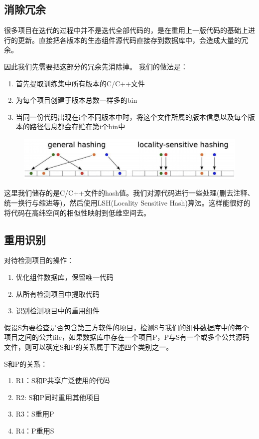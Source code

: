 \documentclass{cjc}
\begin{document}
\subsection{消除冗余}
很多项目在迭代的过程中并不是迭代全部代码的，是在重用上一版代码的基础上进行的更新。直接把各版本的生态组件源代码直接存到数据库中，会造成大量的冗余。

因此我们先需要把这部分的冗余先消除掉。
我们的做法是：
\begin{enumerate}
\item 首先提取训练集中所有版本的C/C++文件
\item 为每个项目创建于版本总数一样多的bin
\item 当同一份代码出现在i个不同版本中时，将这个文件所属的版本信息以及每个版本的路径信息都会存贮在第i个bin中
\end{enumerate}

\begin{figure}[htb]
  \centering
  \includegraphics[width=\linewidth]{pics/LSH.png}
\end{figure}

这里我们储存的是C/C++文件的hash值。我们对源代码进行一些处理(删去注释、统一换行与缩进等)，然后使用LSH(Locality Sensitive Hash)算法。这样能很好的将代码在高纬空间的相似性映射到低维空间去。

\subsection{重用识别}

对待检测项目的操作：
\begin{enumerate}
    \item 优化组件数据库，保留唯一代码
    \item 从所有检测项目中提取代码
    \item 识别检测项目中的重用组件
\end{enumerate}

假设S为要检查是否包含第三方软件的项目，检测S与我们的组件数据库中的每个项目之间的公共file，如果数据库中存在一个项目P，P与S有一个或多个公共源码文件，则可以确定S和P的关系属于下述四个类别之一。

S和P的关系：

\begin{enumerate}
    \item R1：S和P共享广泛使用的代码
    \item R2: S和P同时重用其他项目
    \item R3：S重用P
    \item R4：P重用S
\end{enumerate}
\end{document}
